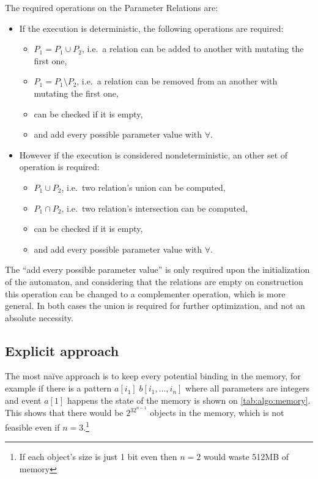 	The required operations on the Parameter Relations are:
	\begin{itemize}
		\item If the execution is deterministic, the following operations are required:
			\begin{itemize}
				\item $P_1 = P_1 \cup P_2$, i.e.~a relation can be added to another with mutating the first one,
				\item $P_1 = P_1 \setminus P_2$, i.e.~a relation can be removed from an another with mutating the first one,
				\item can be checked if it is empty,
				\item and add every possible parameter value with $\forall$.
			\end{itemize}
		\item However if the execution is considered nondeterministic, an other set of operation is required:
			\begin{itemize}
				\item $P_1 \cup P_2$, i.e.~two relation's union can be computed,
				\item $P_1 \cap P_2$, i.e.~two relation's intersection can be computed,
				\item can be checked if it is empty,
				\item and add every possible parameter value with $\forall$.
			\end{itemize}
	\end{itemize}

	The ``add every possible parameter value'' is only required upon the initialization of the automaton, and considering that the relations are empty on construction this operation can be changed to a complementer operation, which is more general.
	In both cases the union is required for further optimization, and not an absolute necessity.

	\subsection{Explicit approach}
	
	The most na\"ive approach is to keep every potential binding in the memory, for example if there is a pattern $a[i_1]\;b[i_1,\dots,i_n]$ where all parameters are integers and event $a[1]$ happens the state of the memory is shown on \cref{tab:algo:memory}. This shows that there would be $2^{32^{n-1}}$ objects in the memory, which is not feasible even if $n=3$.\footnote{If each object's size is just 1 bit even then $n=2$ would waste 512MB of memory}
	
